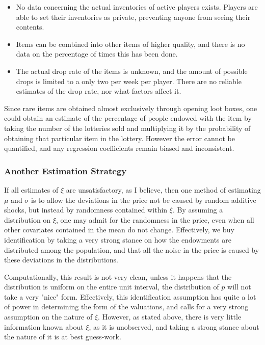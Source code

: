 \documentclass[12pt, letterpaper]{paper}
\begin{document}
\begin{itemize}
\item No data concerning the actual inventories of active
players exists. Players are able to set their inventories as private,
preventing anyone from seeing their contents.
\item Items can be combined into other items of higher quality, and there
is no data on the percentage of times this has been done.
\item The actual drop rate of the items is unknown, and the amount of
possible drops is limited to a only two per week per player. There
are no reliable estimates of the drop rate, nor what factors affect
it.
\end{itemize}

Since rare items are obtained almost exclusively through opening loot
boxes, one could obtain an estimate of the percentage of people
endowed with the item by taking the number of the lotteries sold and
multiplying it by the probability of obtaining that particular item in
the lottery. However the error cannot be quantified, and any
regression coefficients remain biased and inconsistent.

\subsubsection{Another Estimation Strategy}
\label{sec-2-2-2}

If all estimates of $\xi$ are unsatisfactory, as I believe, then one
method of estimating $\mu$ and $\sigma$ is to allow the deviations in the price
not be caused by random additive shocks, but instead by randomness
contained within $\xi$. By assuming a distribution on $\xi$, one may admit for
the randomness in the price, even when all other covariates contained
in the mean do not change. Effectively, we buy identification by
taking a very strong stance on how the endowments are distributed
among the population, and that all the noise in the price is caused by
these deviations in the distributions.

Computationally, this result is not very clean, unless it happens
that the distribution is uniform on the entire unit interval, the
distribution of $p$ will not take a very "nice" form. Effectively, this
identification assumption has quite a lot of power in determining the
form of the valuations, and calls for a very strong assumption on the
nature of $\xi$. However, as stated above, there is very little
information known about $\xi$, as it is unobserved, and taking a strong
stance about the nature of it is at best guess-work. 
\end{document}
